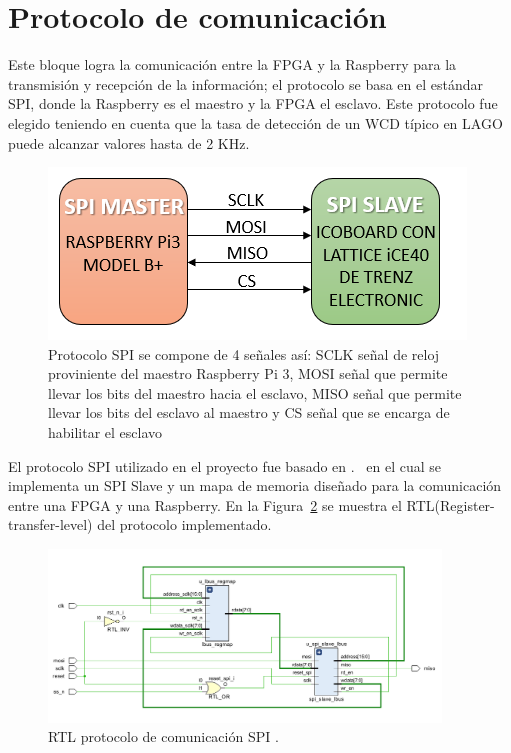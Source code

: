 \section{\textbf{Protocolo de comunicación}}
Este bloque logra la comunicación entre la FPGA y la Raspberry para la transmisión y recepción de la información; el protocolo se basa en el estándar SPI, donde la Raspberry es el maestro y la FPGA el esclavo. Este protocolo fue elegido teniendo en cuenta que la tasa de detección de un WCD típico en LAGO puede alcanzar valores hasta de 2 KHz.~\citep{hernandez2018procedimiento}

\begin{figure}[H]
\includegraphics[scale=1]{Figs/SPIPROTO.PNG} 
\centering
\caption[Esquema protocolo SPI]{Protocolo SPI se compone de 4 señales así: SCLK señal de reloj proviniente del maestro Raspberry Pi 3, MOSI señal que permite llevar los bits del maestro hacia el esclavo, MISO señal que permite llevar los bits del esclavo al maestro y CS señal que se encarga de habilitar el esclavo} 
\label{adecuacion}
\end{figure}

El protocolo SPI utilizado en el proyecto fue basado en .~\citep{charkster/spi_slave_verilog_2020} en el cual se implementa un  SPI Slave y un mapa de memoria diseñado para la comunicación entre una FPGA y una Raspberry. En la Figura~\ref{spi} se muestra el RTL(Register-transfer-level) del protocolo implementado.

\begin{figure}[H]
\includegraphics[width=0.93\textwidth]{Figs/rtlproto.PNG} 
\centering
\caption{RTL protocolo de comunicación SPI .~\citep{XilinxInc.2016IntegratedGuide}} 
\label{spi}
\end{figure}

